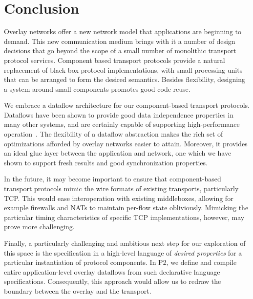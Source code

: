 \documentclass[10pt,twocolumn]{article}
\begin{document}
\section{Conclusion}
\label{sec:discussion}

Overlay networks offer a new network model that applications are beginning 
to demand. This new communication medium brings with it a number of design 
decisions that go beyond the scope of a small number of monolithic
transport protocol services. Component based transport protocols
provide a natural replacement of black box protocol implementations,
with small processing units that can be arranged to form the desired
semantics. Besides flexibility, designing a system around small components promotes
good code reuse.

We embrace a dataflow architecture for our component-based transport
protocols.  Dataflows have been shown to provide good
data independence properties in many other systems, and are certainly
capable of supporting high-performance
operation~\cite{BrewerInktomi}. The flexibility of a
dataflow abstraction makes the rich set of optimizations afforded by
overlay networks easier to attain. Moreover, it provides an ideal glue
layer between the application and network, one which we have shown to
support fresh results and good synchronization properties. 

In the future, it may become important to ensure that component-based
transport 
protocols mimic the wire formats of existing transports, particularly
TCP.  This would ease interoperation with existing middleboxes, allowing
for example firewalls and NATs to maintain per-flow state obliviously.
Mimicking the particular timing characteristics of specific TCP
implementations, however, may prove more challenging.

Finally, a particularly challenging and ambitious next step for our exploration of this space
is the specification in a high-level language of \emph{desired properties}
for a particular instantiation of protocol components.  In P2, we define
and compile entire
application-level overlay dataflows from such declarative language specifications.
Consequently, this approach would allow us to redraw the
boundary between the overlay and the transport.



{\footnotesize

}
\end{document}
